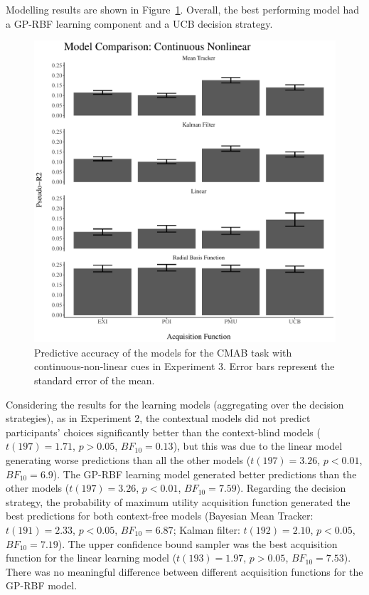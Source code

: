 \documentclass[a4paper,natbib]{apa6}
\begin{document}
Modelling results are shown in Figure~\ref{fig:results3}. Overall, the best performing model had a GP-RBF learning component and a UCB decision strategy. 
%
\begin{figure}[ht!]
\centering
\includegraphics[scale=0.55]{modelcomparison3.pdf}
\caption{Predictive accuracy of the models for the CMAB task with continuous-non-linear cues in Experiment 3. Error bars represent the standard error of the mean.}
\label{fig:results3}
\end{figure}
%
Considering the results for the learning models (aggregating over the decision strategies), as in Experiment 2, the contextual models did not predict participants' choices significantly better than the context-blind models ($t(197) =1.71$, $p>0.05$, $BF_{10}=0.13$), but this was due to the linear model generating worse predictions than all the other models ($t(197)=3.26$, $p<0.01$, $BF_{10}=6.9$). The GP-RBF learning model generated better predictions than the other models ($t(197)=3.26$, $p<0.01$, $BF_{10}=7.59$). Regarding the decision strategy, the probability of maximum utility acquisition function generated the best predictions for both context-free models (Bayesian Mean Tracker: $t(191)=2.33$, $p<0.05$, $BF_{10}=6.87$; Kalman filter: $t(192)=2.10$, $p<0.05$, $BF_{10}=7.19$). The upper confidence bound sampler was the best acquisition function for the linear learning model ($t(193)= 1.97$, $p>0.05$, $BF_{10}=7.53$). There was no meaningful difference between different acquisition functions for the GP-RBF model.
\end{document}
